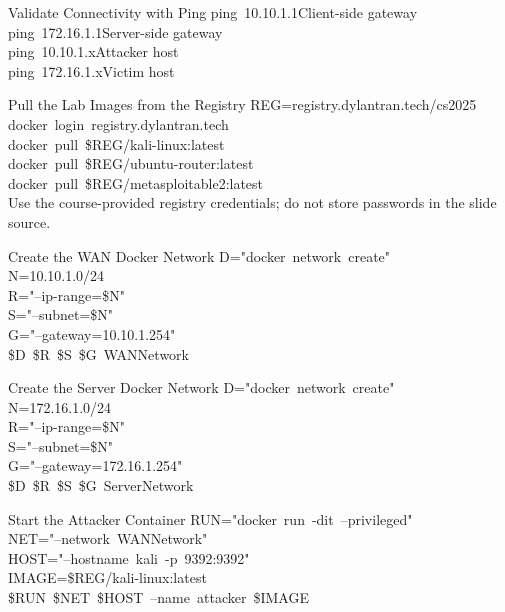 \documentclass[aspectratio=169,11pt]{beamer}
\newcommand{\Cmd}[1]{{\color{CommandGreen}\ttfamily\fontsize{18}{22}\selectfont\mbox{#1}}}
\renewcommand{\SmallNote}[1]{%
  {\color{SecondaryColor}\fontsize{18}{22}\selectfont #1}%
}
\begin{document}
\begin{frame}{Validate Connectivity with Ping}
  \Cmd{ping 10.10.1.1}\quad Client-side gateway\\[0.28cm]
  \Cmd{ping 172.16.1.1}\quad Server-side gateway\\[0.28cm]
  \Cmd{ping 10.10.1.x}\quad Attacker host\\[0.28cm]
  \Cmd{ping 172.16.1.x}\quad Victim host
\end{frame}

\begin{frame}{Pull the Lab Images from the Registry}
  \Cmd{REG=registry.dylantran.tech/cs2025}\\[0.25cm]
  \Cmd{docker login registry.dylantran.tech}\\[0.35cm]
  \Cmd{docker pull \$REG/kali-linux:latest}\\[0.25cm]
  \Cmd{docker pull \$REG/ubuntu-router:latest}\\[0.25cm]
  \Cmd{docker pull \$REG/metasploitable2:latest}\\[0.4cm]
  \SmallNote{Use the course-provided registry credentials; do not store passwords in the slide source.}
\end{frame}

\begin{frame}{Create the WAN Docker Network}
  \Cmd{D="docker network create"}\\[0.25cm]
  \Cmd{N=10.10.1.0/24}\\[0.25cm]
  \Cmd{R="--ip-range=\$N"}\\[0.25cm]
  \Cmd{S="--subnet=\$N"}\\[0.25cm]
  \Cmd{G="--gateway=10.10.1.254"}\\[0.25cm]
  \Cmd{\$D \$R \$S \$G WANNetwork}
\end{frame}

\begin{frame}{Create the Server Docker Network}
  \Cmd{D="docker network create"}\\[0.25cm]
  \Cmd{N=172.16.1.0/24}\\[0.25cm]
  \Cmd{R="--ip-range=\$N"}\\[0.25cm]
  \Cmd{S="--subnet=\$N"}\\[0.25cm]
  \Cmd{G="--gateway=172.16.1.254"}\\[0.25cm]
  \Cmd{\$D \$R \$S \$G ServerNetwork}
\end{frame}

\begin{frame}{Start the Attacker Container}
  \Cmd{RUN="docker run -dit --privileged"}\\[0.25cm]
  \Cmd{NET="--network WANNetwork"}\\[0.25cm]
  \Cmd{HOST="--hostname kali -p 9392:9392"}\\[0.25cm]
  \Cmd{IMAGE=\$REG/kali-linux:latest}\\[0.25cm]
  \Cmd{\$RUN \$NET \$HOST --name attacker \$IMAGE}
\end{frame}
\end{document}
